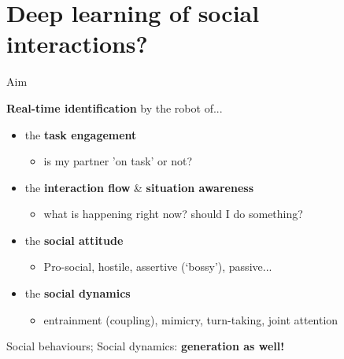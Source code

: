 \documentclass[compress]{beamer}
\begin{document}

\section[DNNs for Social Robotics]{Deep learning of social interactions?}



\begin{frame}{Aim}

    {\bf Real-time identification} by the robot of...

    \begin{itemize}
        \item<+-> the \textbf{task engagement}
            \begin{itemize}
                \item is my partner 'on task' or not?
            \end{itemize}
        \item<+-> the \textbf{interaction flow} \& \textbf{situation awareness}
            \begin{itemize}
                \item what is happening right now? should I do something?
            \end{itemize}
        \item<+-> the \textbf{social attitude}
            \begin{itemize}
                \item Pro-social, hostile, assertive (‘bossy’), passive...
            \end{itemize}
        \item<+-> the \textbf{social dynamics}
            \begin{itemize}
                \item entrainment (coupling), mimicry, turn-taking, joint
                    attention
            \end{itemize}
    \end{itemize}

    \pause

    Social behaviours; Social dynamics: \textbf{generation as well!}
\end{frame}
\end{document}
